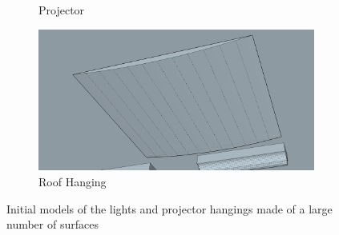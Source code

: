 \documentclass[../../main.tex]{subfiles}
\begin{document}
\begin{figure}[ht]
\begin{subfigure}[t]{3in}
					\caption{Projector}
				\end{subfigure}
				\begin{subfigure}[t]{3in}
					\centering
					\includegraphics[scale = 0.25]{Sections/Implementation/Modelling/images/concave1.png}
					\caption{Roof Hanging}
				\end{subfigure}
				\caption{Initial models of the lights and projector hangings made of a large number of surfaces}
				\label{surfaces}
			\end{figure}

\end{document}

